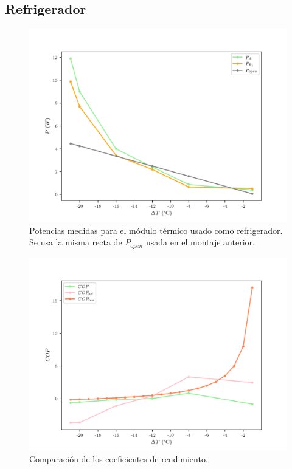 \subsection{Refrigerador}

\begin{figure}[ht]
    \centering
    \includegraphics[width = 0.8\linewidth]{img/refri_powers.png}
    \caption{Potencias medidas para el módulo térmico usado como refrigerador. Se usa la misma recta de $P_{open}$ usada en el montaje anterior.}
    \label{fig:refri_powers}
\end{figure}

\begin{figure}[ht]
    \centering
    \includegraphics[width = 0.8\linewidth]{img/refri_cops.png}
    \caption{Comparación de los coeficientes de rendimiento.}
    \label{fig:refri_cops}
\end{figure}

